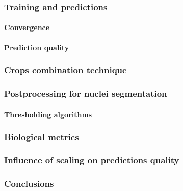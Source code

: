     \subsubsection{Training and predictions}
        \paragraph{Convergence}
              
        \paragraph{Prediction quality}
            \label{section:nuclei-predictions}
              
    \subsubsection{Crops combination technique}\label{par:crops-combination}
        
    \subsubsection{Postprocessing for nuclei segmentation}
        
        \paragraph{Thresholding algorithms}
        
    \subsubsection{Biological metrics}
        
    \subsubsection{Influence of scaling on predictions quality}
        
    \subsubsection{Conclusions}
        
